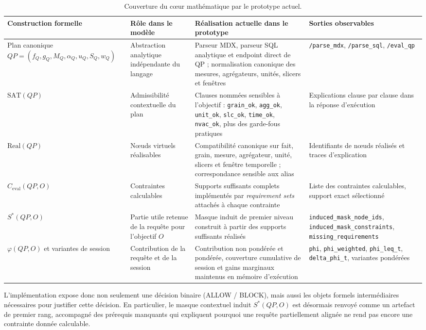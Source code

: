 \documentclass[journal]{IEEEtran}
\begin{document}
\begin{table}[!t]
\centering
\caption{Couverture du cœur mathématique par le prototype actuel.}
\scriptsize
\setlength{\tabcolsep}{4pt}
\begin{tabular}{@{}p{2.35cm}p{3.0cm}p{3.6cm}p{3.0cm}@{}}
\toprule
Construction formelle & Rôle dans le modèle & Réalisation actuelle dans le prototype & Sorties observables \\
\midrule
Plan canonique $QP=(f_Q,g_Q,M_Q,\alpha_Q,u_Q,S_Q,w_Q)$ & Abstraction analytique indépendante du langage & Parseur MDX, parseur SQL analytique et endpoint direct de QP ; normalisation canonique des mesures, agrégateurs, unités, slicers et fenêtres & \texttt{/parse\_mdx}, \texttt{/parse\_sql}, \texttt{/eval\_qp} \\
$\mathrm{SAT}(QP)$ & Admissibilité contextuelle du plan & Clauses nommées sensibles à l'objectif : \texttt{grain\_ok}, \texttt{agg\_ok}, \texttt{unit\_ok}, \texttt{slc\_ok}, \texttt{time\_ok}, \texttt{nvac\_ok}, plus des garde-fous pratiques & Explications clause par clause dans la réponse d'exécution \\
$\mathrm{Real}(QP)$ & Nœuds virtuels réalisables & Compatibilité canonique sur fait, grain, mesure, agrégateur, unité, slicers et fenêtre temporelle ; correspondance sensible aux alias & Identifiants de nœuds réalisés et traces d'explication \\
$C_{\mathrm{eval}}(QP,O)$ & Contraintes calculables & Supports suffisants complets implémentés par \emph{requirement sets} attachés à chaque contrainte & Liste des contraintes calculables, support exact sélectionné \\
$S^*(QP,O)$ & Partie utile retenue de la requête pour l'objectif $O$ & Masque induit de premier niveau construit à partir des supports suffisants réalisés & \texttt{induced\_mask\_node\_ids}, \texttt{induced\_mask\_constraints}, \texttt{missing\_requirements} \\
$\varphi(QP,O)$ et variantes de session & Contribution de la requête et de la session & Contribution non pondérée et pondérée, couverture cumulative de session et gains marginaux maintenus en mémoire d'exécution & \texttt{phi}, \texttt{phi\_weighted}, \texttt{phi\_leq\_t}, \texttt{delta\_phi\_t}, variantes pondérées \\
\bottomrule
\end{tabular}
\normalsize
\label{tab:formal-coverage}
\end{table}

L'implémentation expose donc non seulement une décision binaire (ALLOW / BLOCK), mais aussi les objets formels intermédiaires nécessaires pour justifier cette décision. En particulier, le masque contextuel induit $S^*(QP,O)$ est désormais renvoyé comme un artefact de premier rang, accompagné des prérequis manquants qui expliquent pourquoi une requête partiellement alignée ne rend pas encore une contrainte donnée calculable.
\end{document}
